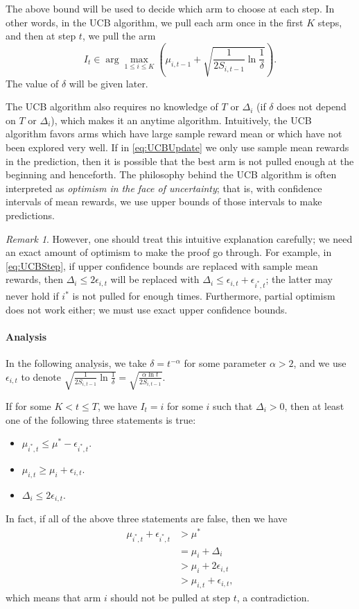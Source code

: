 \documentclass[openany]{book}
\theoremstyle{definition}
\theoremstyle{remark}
\newtheorem*{remark}{Remark}
\begin{document}
The above bound will be used to decide which arm to choose at each step. In other words, in the UCB algorithm, we pull each arm once in the first $K$ steps, and then at step $t$, we pull the arm
\begin{equation}\label{eq:UCBUpdate}
    I_t\in\arg\max_{1\le i\le K}\left(\mu_{i,t-1}+\sqrt{\frac{1}{2S_{i,t-1}}\ln \frac{1}{\delta}}\right).
\end{equation}
The value of $\delta$ will be given later.

The UCB algorithm also requires no knowledge of $T$ or $\Delta_i$ (if $\delta$ does not depend on $T$ or $\Delta_i$), which makes it an anytime algorithm. Intuitively, the UCB algorithm favors arms which have large sample reward mean or which have not been explored very well. If in \eqref{eq:UCBUpdate} we only use sample mean rewards in the prediction, then it is possible that the best arm is not pulled enough at the beginning and henceforth. The philosophy behind the UCB algorithm is often interpreted as \emph{optimism in the face of uncertainty}; that is, with confidence intervals of mean rewards, we use upper bounds of those intervals to make predictions.
\begin{remark}
    However, one should treat this intuitive explanation carefully; we need an exact amount of optimism to make the proof go through. For example, in \eqref{eq:UCBStep}, if upper confidence bounds are replaced with sample mean rewards, then $\Delta_i\le2\epsilon_{i,t}$ will be replaced with $\Delta_i\le\epsilon_{i,t}+\epsilon_{i^*,t}$; the latter may never hold if $i^*$ is not pulled for enough times. Furthermore, partial optimism does not work either; we must use exact upper confidence bounds.
\end{remark}

\paragraph{Analysis}
In the following analysis, we take $\delta=t^{-\alpha}$ for some parameter $\alpha>2$, and we use $\epsilon_{i,t}$ to denote $\sqrt{\frac{1}{2S_{i,t-1}}\ln \frac{1}{\delta}}=\sqrt{\frac{\alpha\ln t}{2S_{i,t-1}}}$.

If for some $K<t\le T$, we have $I_t=i$ for some $i$ such that $\Delta_i>0$, then at least one of the following three statements is true:
\begin{itemize}
    \item $\mu_{i^*,t}\le\mu^*-\epsilon_{i^*,t}$.
    \item $\mu_{i,t}\ge\mu_i+\epsilon_{i,t}$.
    \item $\Delta_i\le2\epsilon_{i,t}$.
\end{itemize}
In fact, if all of the above three statements are false, then we have
\begin{align*}
    \mu_{i^*,t}+\epsilon_{i^*,t} & >\mu^* \\
     & =\mu_i+\Delta_i \\
     & >\mu_i+2\epsilon_{i,t} \\
     & >\mu_{i,t}+\epsilon_{i,t},
\end{align*}
which means that arm $i$ should not be pulled at step $t$, a contradiction.
\end{document}
